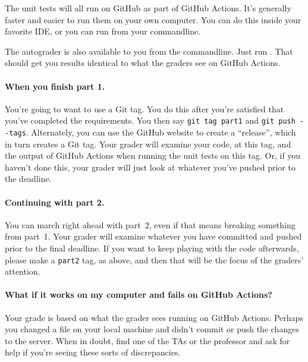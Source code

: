 The unit tests will all run on GitHub as part of GitHub Actions. It's
generally faster and easier to run them on your own computer. You can
do this inside your favorite IDE, or you can run  from
your commandline.

The autograder is also available to you from the commandline.
Just run .
That should get you results identical to what the graders see
on GitHub Actions.

\paragraph{When you finish part 1.} You're going to want to use a Git
tag. You do this after you're satisfied that you've completed the
requirements. You then say {\tt git tag part1} and {\tt git push
  -{}-tags}. Alternately, you can use the GitHub website to create a
``release'', which in turn creates a Git tag. Your grader will
examine your code, at this tag, and the output of GitHub Actions
when running the unit tests on this tag. Or, if you haven't done
this, your grader will just look at whatever you've pushed prior
to the deadline.

\paragraph{Continuing with part 2.} You can march right ahead with
part~2, even if that means breaking something from part~1. Your
grader will examine whatever you have committed and pushed prior to the
final deadline. If you want to keep playing with the code afterwards,
please make a {\tt part2} tag, as above, and then that will
be the focus of the graders' attention.

\paragraph{What if it works on my computer and fails on GitHub
  Actions?} Your grade is based on what the grader sees running on
GitHub Actions. Perhaps you changed a file on your local machine and
didn't commit or push the changes to the server. When in doubt,
find one of the TAs or the professor and ask for help if you're
seeing these sorts of discrepancies.


